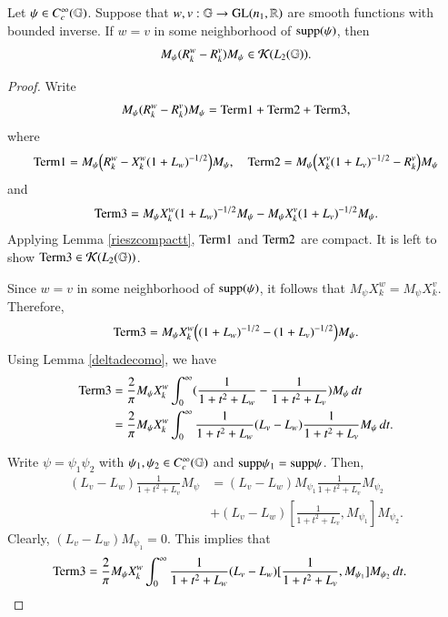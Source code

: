 \documentclass[leqno]{amsart}
\begin{document}
	
	\begin{proposition}\label{compactrieszquo}
		Let $\psi\in C_{c}^{\infty}(\mathbb{G})$. Suppose that $w,v:\mathbb{G}\rightarrow{\rm GL}(n_{1},\mathbb{R})$ are smooth functions with bounded inverse. If $w=v$ in some neighborhood of ${\rm supp}(\psi)$, then
		\begin{align*}
			M_{\psi}({ R}^{w}_{k}-{ R}^{v}_{k})M_{\psi}\in{\mathcal K}(L_{2}(\mathbb{G})).
		\end{align*}
	\end{proposition}
	\begin{proof}
		Write
		\begin{align*}
			M_{\psi}({ R}^{w}_{k}-{ R}^{v}_{k})M_{\psi}={\rm Term1}+{\rm Term2}+{\rm Term3},
		\end{align*}
		where
		\begin{align*}
			{\rm Term1}=M_{\psi}\Big({ R}^{w}_{k}-X_{k}^{w}(1+L_{w})^{-1/2}
			\Big)M_{\psi},\quad
			{\rm Term2}=M_{\psi}\Big(X_{k}^{v}(1+L_{v})^{-1/2}-{ R}^{v}_{k}\Big)M_{\psi}
		\end{align*}
		and
		\begin{align*}
			{\rm Term3}
			=M_{\psi}X_{k}^{w}(1+L_{w})^{-1/2}M_{\psi}-M_{\psi}X_{k}^{v}(1+L_{v})^{-1/2}M_{\psi}.
		\end{align*}
		Applying Lemma \ref{rieszcompactt}, ${\rm Term1}$ and ${\rm Term2}$ are compact. It is left to show ${\rm Term3}\in{\mathcal K}(L_{2}(\mathbb{G}))$.
		
		Since $w=v$ in some neighborhood of ${\rm supp}(\psi)$, it follows that $M_{\psi}X_{k}^{w}=M_{\psi}X_{k}^{v}$.
		Therefore,
		\begin{align*}
			{\rm Term3}=M_{\psi}X_{k}^{w}\Big((1+L_{w})^{-1/2}-(1+L_{v})^{-1/2}\Big)M_{\psi}.
		\end{align*}
		Using Lemma \ref{deltadecomo}, we have
		\begin{align*}
			{\rm Term3}
			&=\frac{2}{\pi}M_{\psi}X_{k}^{w}\int_{0}^{\infty}(\frac{1}{1+t^{2}+L_{w}}-\frac{1}{1+t^{2}+L_{v}})M_{\psi}\,dt\\
			&=\frac{2}{\pi}M_{\psi}X_{k}^{w}\int_{0}^{\infty}\frac{1}{1+t^{2}+L_{w}}(L_{v}-L_{w})\frac{1}{1+t^{2}+L_{v}}M_{\psi}\,dt.
		\end{align*}
		
		Write $\psi=\psi_{1}\psi_{2}$ with $\psi_{1},\psi_{2}\in C_{c}^{\infty}(\mathbb{G})$ and ${\rm supp}\psi_{1}={\rm supp}\psi$. Then,
		\begin{align*}
			(L_{v}-L_{w})\frac{1}{1+t^{2}+L_{v}}M_{\psi}&=(L_{v}-L_{w})M_{\psi_{1}}\frac{1}{1+t^{2}+L_{v}}M_{\psi_{2}}\\
			&+(L_{v}-L_{w})[\frac{1}{1+t^{2}+L_{v}},M_{\psi_{1}}]M_{\psi_{2}}.
		\end{align*}
		Clearly, $(L_{v}-L_{w})M_{\psi_{1}}=0$. This implies that
		\begin{align*}
			{\rm Term3}
			&=\frac{2}{\pi}M_{\psi}X_{k}^{w}\int_{0}^{\infty}\frac{1}{1+t^{2}+L_{w}}(L_{v}-L_{w})[\frac{1}{1+t^{2}+L_{v}},M_{\psi_{1}}]M_{\psi_{2}}\,dt.
		\end{align*}
		

\end{proof}
\end{document}
